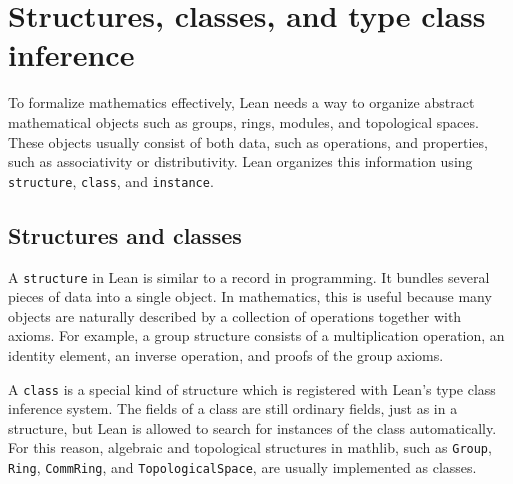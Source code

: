 

\section{Structures, classes, and type class inference}
\label{sec:structures_classes_inference}

To formalize mathematics effectively, Lean needs a way to organize
abstract mathematical objects such as groups, rings, modules, and
topological spaces.  These objects usually consist of both data, such as
operations, and properties, such as associativity or distributivity.
Lean organizes this information using \lstinline|structure|,
\lstinline|class|, and \lstinline|instance|.

\subsection{Structures and classes}

A \lstinline|structure| in Lean is similar to a record in programming.
It bundles several pieces of data into a single object.  In mathematics,
this is useful because many objects are naturally described by a
collection of operations together with axioms.  For example, a group
structure consists of a multiplication operation, an identity element, an
inverse operation, and proofs of the group axioms.

A \lstinline|class| is a special kind of structure which is registered
with Lean's type class inference system.  The fields of a class are still
ordinary fields, just as in a structure, but Lean is allowed to search for
instances of the class automatically.  For this reason, algebraic and
topological structures in \textsf{mathlib}, such as \lstinline|Group|,
\lstinline|Ring|, \lstinline|CommRing|, and \lstinline|TopologicalSpace|,
are usually implemented as classes.

